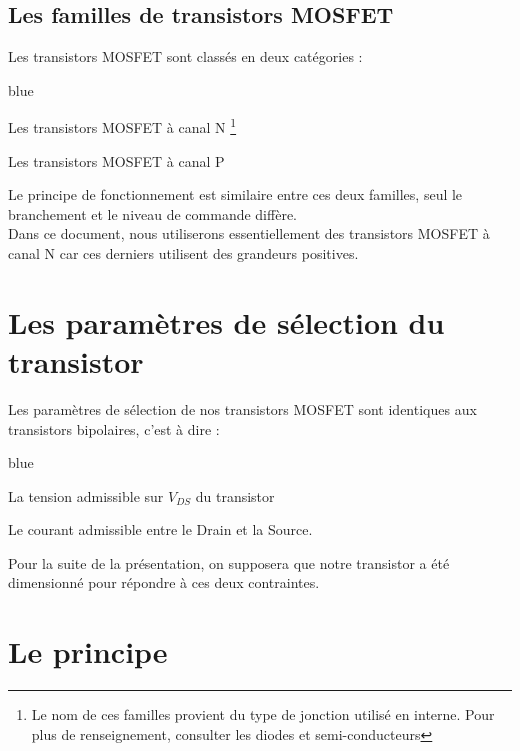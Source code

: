     \subsection{Les familles de transistors MOSFET}

     Les transistors MOSFET sont classés en deux catégories : 
     
     \begin{items}{blue}{\Triangle}
     
       \item Les transistors MOSFET à canal N \footnote{Le nom de ces familles provient du type de jonction utilisé en interne. Pour plus de renseignement, consulter les diodes et semi-conducteurs}
       \item Les transistors MOSFET à canal P
     
     \end{items}
     
     Le principe de fonctionnement est similaire entre ces deux familles, seul le branchement et le niveau de commande diffère.\\
     Dans ce document, nous utiliserons essentiellement des transistors MOSFET à canal N car ces derniers utilisent des grandeurs 
     positives.
     

     \section{Les paramètres de sélection du transistor}
     
     Les paramètres de sélection de nos transistors MOSFET sont identiques aux transistors bipolaires, c'est à dire :
     
     \begin{items}{blue}{\Triangle}
     
       \item La tension admissible sur $V_{DS}$ du transistor
       \item Le courant admissible entre le Drain et la Source.
     \end{items}
     
     Pour la suite de la présentation, on supposera que notre transistor a été dimensionné pour répondre à ces deux contraintes.


     \section{Le principe}

